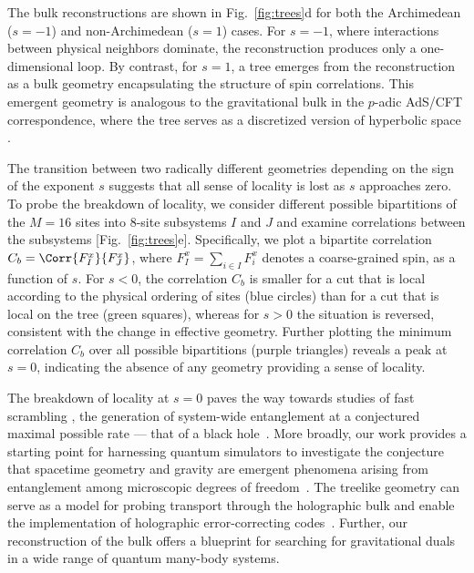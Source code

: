 \documentclass[aps,pra,twocolumn,superscriptaddress]{revtex4-1} %
\begin{document}
\begin{bibunit}
The bulk reconstructions are shown in Fig.~\ref{fig:trees}d for both the Archimedean ($s=-1$) and non-Archimedean ($s=1$) cases.  For $s = -1$, where interactions between physical neighbors dominate, the reconstruction produces only a one-dimensional loop.  By contrast, for $s = 1$, a tree emerges from the reconstruction as a bulk geometry encapsulating the structure of spin correlations. This emergent geometry is analogous to the gravitational bulk in the $p$-adic AdS/CFT correspondence, where the tree serves as a discretized version of hyperbolic space \cite{gubser2017p,heydeman2016tensor}.


The transition between two radically different geometries depending on the sign of the exponent $s$ suggests that all sense of locality is lost as $s$ approaches zero.  To probe the breakdown of locality, we consider different possible bipartitions of the $M=16$ sites into 8-site subsystems $I$ and $J$ and examine correlations between the subsystems [Fig.~\ref{fig:trees}e].  Specifically, we plot a bipartite correlation $C_b = \Corr{F^x_I}{F^x_J}$, where $F^x_I = \sum_{i\in I} F^x_i$ denotes a coarse-grained spin, as a function of $s$.  For $s<0$, the correlation $C_b$ is smaller for a cut that is local according to the physical ordering of sites (blue circles) than for a cut that is local on the tree (green squares), whereas for $s>0$ the situation is reversed, consistent with the change in effective geometry.  Further plotting the minimum correlation $C_b$ over all possible bipartitions (purple triangles) reveals a peak at $s=0$, indicating the absence of any geometry providing a sense of locality.

The breakdown of locality at $s=0$ paves the way towards studies of fast scrambling \cite{bentsen2019treelike}, the generation of system-wide entanglement at a conjectured maximal possible rate --- that of a black hole~\cite{hayden2007black,sekino2008fast}.  More broadly, our work provides a starting point for harnessing quantum simulators to investigate the conjecture that spacetime geometry and gravity are emergent phenomena arising from entanglement among microscopic degrees of freedom~\cite{qi2018does}.  The treelike geometry can serve as a model for probing transport through the holographic bulk and enable the implementation of holographic error-correcting codes~\cite{Pastawski2015, heydeman2016tensor}.  Further, our reconstruction of the bulk offers a blueprint for searching for gravitational duals in a wide range of quantum many-body systems.


\end{bibunit}
\end{document}
